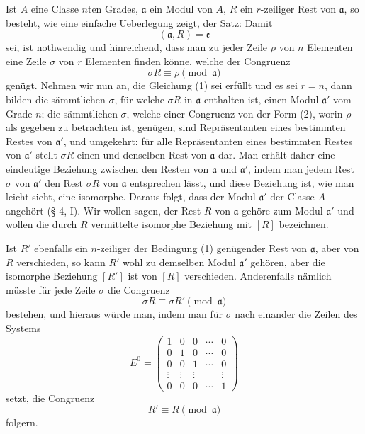 Ist $A$ eine Classe $n$ten Grades, $\mathfrak a$ ein Modul von $A$, $R$ ein $r$-zeiliger Rest von $\mathfrak a$, so besteht, wie eine einfache Ueberlegung zeigt, der Satz: Damit
\begin{equation}
 (\mathfrak a,R)=\mathfrak e
\tag{1}
\end{equation}
sei, ist nothwendig und hinreichend, dass man zu jeder Zeile $\rho$ von $n$ Elementen eine Zeile $\sigma$ von $r$ Elementen finden könne, welche der Congruenz
\begin{equation}
 \sigma R\equiv\rho\pmod{\mathfrak a}
\tag{2}
\end{equation}
genügt. Nehmen wir nun an, die Gleichung (1) sei erfüllt und es sei $r=n$, dann bilden die sämmtlichen $\sigma$, für welche $\sigma R$ in $\mathfrak a$ enthalten ist, einen Modul $\mathfrak a'$ vom Grade $n$; die sämmtlichen $\sigma$, welche einer Congruenz von der Form (2), worin $\rho$ als gegeben zu betrachten ist, genügen, sind Repräsentanten eines bestimmten Restes von $\mathfrak a'$, und umgekehrt: für alle Repräsentanten eines bestimmten Restes von $\mathfrak a'$ stellt $\sigma R$ einen und denselben Rest von $\mathfrak a$ dar. Man erhält daher eine eindeutige Beziehung zwischen den Resten von $\mathfrak a$ und $\mathfrak a'$, indem man jedem Rest $\sigma$ von $\mathfrak a'$ den Rest $\sigma R$ von $\mathfrak a$ entsprechen lässt, und diese Beziehung ist, wie man leicht sieht, eine isomorphe. Daraus folgt, dass der Modul $\mathfrak a'$ der Classe $A$ angehört (§ 4, I). Wir wollen sagen, der Rest $R$ von $\mathfrak a$ gehöre zum Modul $\mathfrak a'$ und wollen die durch $R$ vermittelte isomorphe Beziehung mit $[R]$ bezeichnen.

Ist $R'$ ebenfalls ein $n$-zeiliger der Bedingung (1) genügender Rest von $\mathfrak a$, aber von $R$ verschieden, so kann $R'$ wohl zu demselben Modul $\mathfrak a'$ gehören, aber die isomorphe Beziehung $[R']$ ist von $[R]$ verschieden. Anderenfalls nämlich müsste für jede Zeile $\sigma$ die Congruenz
\[
 \sigma R\equiv\sigma R'\pmod{\mathfrak a}
\]
bestehen, und hieraus würde man, indem man für $\sigma$ nach einander die Zeilen des Systems
\[
 E^0=\begin{pmatrix}
 1&0&0&\cdots&0\\
 0&1&0&\cdots&0\\
 0&0&1&\cdots&0\\
 \vdots&\vdots&\vdots&&\vdots\\
 0&0&0&\cdots&1
 \end{pmatrix}
\]
setzt, die Congruenz
\[
 R'\equiv R\pmod{\mathfrak a}
\]
folgern.


